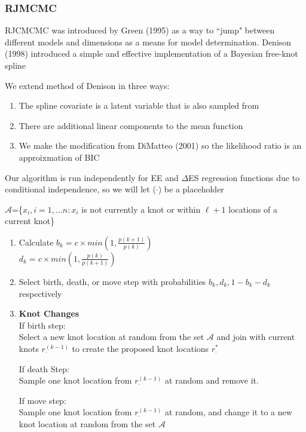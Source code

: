 \documentclass[handout]{beamer}\usepackage[]{graphicx}\usepackage[]{color}
\begin{document}
\begin{frame}
\frametitle{RJMCMC}
RJCMCMC was introduced by Green (1995) as a way to ``jump" between different models and dimensions as a means for model determination. Denison (1998) introduced a simple and effective implementation of a Bayesian free-knot spline

\vspace{0.3cm}

We extend method of Denison  in three ways:
\begin{enumerate}
\item
The spline covariate is a latent variable that is also sampled from
\item
There are additional linear components to the mean function
\item
We make the modification from DiMatteo (2001) so the likelihood ratio is an approixmation of BIC
\end{enumerate}

\vspace{0.3cm}
Our algorithm is run independently for EE and $\Delta$ES regression functions due to conditional independence, so we will let ($\cdot$) be a placeholder

\end{frame}

\begin{frame}
$\mathcal{A}$=\{$x_i,i=1,...n:x_i$ is not currently a knot or within $\ell+1$ locations of a current knot\}


\begin{enumerate}
\item
Calculate $b_k = c \times min\left(1, \frac{p(k+1)}{p(k)} \right)$ \\
$d_k = c \times min\left(1, \frac{p(k)}{p(k+1)} \right)$ 

\item
Select birth, death, or move step with probabilities $b_k,d_k,1-b_k-d_k$ respectively \\

\item
{\bf Knot Changes} \\
If birth step:\\
Select a new knot location at random from the set $\mathcal{A}$ and join with current knots $r_{\cdot}^{(k-1)}$ to create the proposed knot locations $r_{\cdot}^{*}$

If death Step:\\
Sample one knot location from $r_{\cdot}^{(k-1)}$ at random and remove it. 

If move step:\\
Sample one knot location from $r_{\cdot}^{(k-1)}$ at random, and change it to a new knot location at random from the set $\mathcal{A}$

\end{enumerate}
\end{frame}
\end{document}
